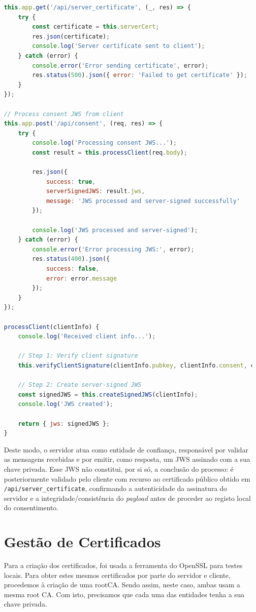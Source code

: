 \begin{lstlisting}[language=Javascript]
this.app.get('/api/server_certificate', (_, res) => {
	try {
		const certificate = this.serverCert;
		res.json(certificate);
		console.log('Server certificate sent to client');
	} catch (error) {
		console.error('Error sending certificate', error);
		res.status(500).json({ error: 'Failed to get certificate' });
	}
});

// Process consent JWS from client
this.app.post('/api/consent', (req, res) => {
	try {
		console.log('Processing consent JWS...');
		const result = this.processClient(req.body);

		res.json({
			success: true,
			serverSignedJWS: result.jws,
			message: 'JWS processed and server-signed successfully'
		});

		console.log('JWS processed and server-signed');
	} catch (error) {
		console.error('Error processing JWS:', error);
		res.status(400).json({
			success: false,
			error: error.message
		});
	}
});

processClient(clientInfo) {
	console.log('Received client info...');

	// Step 1: Verify client signature
	this.verifyClientSignature(clientInfo.pubkey, clientInfo.consent, clientInfo.signature)

	// Step 2: Create server-signed JWS
	const signedJWS = this.createSignedJWS(clientInfo);
	console.log('JWS created');

	return { jws: signedJWS };
}
\end{lstlisting}

Deste modo, o servidor atua como entidade de confiança, responsável por validar as mensagens recebidas e por emitir, como resposta, um JWS assinado com a sua chave privada. Esse JWS não constitui, por si só, a conclusão do processo: é posteriormente validado pelo cliente com recurso ao certificado público obtido em \texttt{/api/server\_certificate}, confirmando a autenticidade da assinatura do servidor e a integridade/consistência do \textit{payload} antes de proceder ao registo local do consentimento.


\section{Gestão de Certificados}
Para a criação dos certificados, foi usada a ferramenta do OpenSSL para testes locais. Para obter estes mesmos certificados por parte do servidor e cliente, procedemos à criação de uma rootCA. Sendo assim, neste caso, ambas usam a mesma root CA. Com isto, precisamos que cada uma das entidades tenha a sua chave privada.

